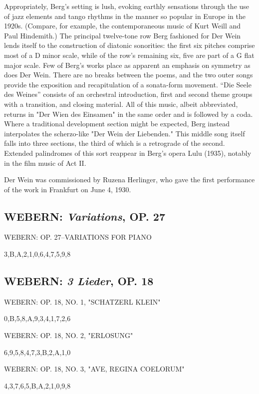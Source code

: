 		Appropriately, Berg's setting is lush, evoking earthly sensations through the use of jazz elements and tango rhythms in the manner so popular in Europe in the 1920s. (Compare, for example, the contemporaneous music of Kurt Weill and Paul Hindemith.) The principal twelve-tone row Berg fashioned for Der Wein lends itself to the construction of diatonic sonorities: the first six pitches comprise most of a D minor scale, while of the row's remaining six, five are part of a G flat major scale. Few of Berg's works place as apparent an emphasis on symmetry as does Der Wein. There are no breaks between the poems, and the two outer songs provide the exposition and recapitulation of a sonata-form movement. ``Die Seele des Weines'' consists of an orchestral introduction, first and second theme groups with a transition, and closing material. All of this music, albeit abbreviated, returns in "Der Wien des Einsamen" in the same order and is followed by a coda. Where a traditional development section might be expected, Berg instead interpolates the scherzo-like "Der Wein der Liebenden." This middle song itself falls into three sections, the third of which is a retrograde of the second. Extended palindromes of this sort reappear in Berg's opera Lulu (1935), notably in the film music of Act II.

		Der Wein was commissioned by Ruzena Herlinger, who gave the first performance of the work in Frankfurt on June 4, 1930.
		
		\subsection{WEBERN: \textit{Variations}, OP. 27}     
		
		WEBERN: OP. 27--VARIATIONS FOR PIANO
		
		{3,B,A,2,1,0,6,4,7,5,9,8}
		
		\subsection{WEBERN: \textit{3 Lieder}, OP. 18}
		
		WEBERN: OP. 18, NO. 1, "SCHATZERL KLEIN"
		
		{0,B,5,8,A,9,3,4,1,7,2,6}
		
		WEBERN: OP. 18, NO. 2, "ERLOSUNG"
		
		{6,9,5,8,4,7,3,B,2,A,1,0}
				
		WEBERN: OP. 18, NO. 3, "AVE, REGINA COELORUM"
		
		{4,3,7,6,5,B,A,2,1,0,9,8}	
		
